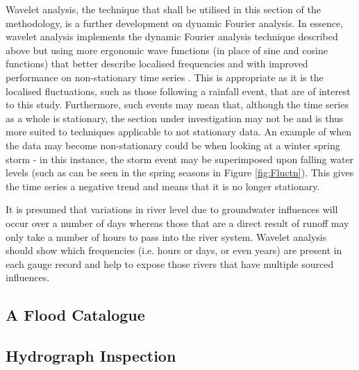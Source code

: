 \documentclass[DIV=calc, paper=a4, fontsize=11pt, twocolumn]{scrartcl}	 %
\begin{document}
Wavelet analysis, the technique that shall be utilised in this section of the methodology, is a further development on dynamic Fourier analysis. In essence, wavelet analysis implements the dynamic Fourier analysis technique described above but using more ergonomic wave functions (in place of sine and cosine functions) that better describe localised frequencies and with improved performance on non-stationary time series \citep[p 234]{Shumway2006}. This is appropriate as it is the localised fluctuations, such as those following a rainfall event, that are of interest to this study. Furthermore, such events may mean that, although the time series as a whole is stationary, the section under investigation may not be and is thus more suited to techniques applicable to not stationary data. An example of when the data may become non-stationary could be when looking at a winter spring storm - in this instance, the storm event may be superimposed upon falling water levels (such as can be seen in the spring seasons in Figure \ref{fig:Fluctn}). This gives the time series a negative trend and means that it is no longer stationary.

It is presumed that variations in river level due to groundwater influences will occur over a number of days whereas those that are a direct result of runoff may only take a number of hours to pass into the river system. Wavelet analysis should show which frequencies (i.e. hours or days, or even years) are present in each gauge record and help to expose those rivers that have multiple sourced influences.


	\subsection{A Flood Catalogue}
	\subsection{Hydrograph Inspection}
\end{document}
